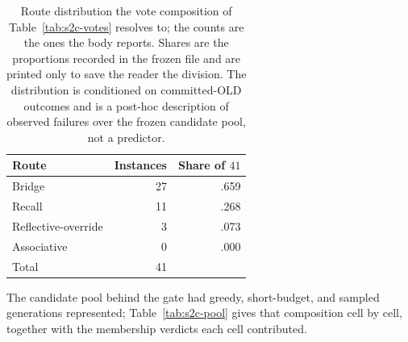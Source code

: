 \documentclass[letterpaper]{article}
\begin{document}
\begin{table}[t]
\centering
\small
\begin{tabular}{lrr}
\toprule
Route & Instances & Share of \(41\) \\
\midrule
Bridge              & 27 & .659 \\
Recall              & 11 & .268 \\
Reflective-override &  3 & .073 \\
Associative         &  0 & .000 \\
\midrule
Total               & 41 & \\
\bottomrule
\end{tabular}
\caption{Route distribution the vote composition of
Table~\ref{tab:s2c-votes} resolves to; the counts are the ones the body reports.
Shares are the proportions recorded in the frozen file and are printed only to
save the reader the division.  The distribution is conditioned on committed-OLD
outcomes and is a post-hoc description of observed failures over the frozen
candidate pool, not a predictor.}
\label{tab:s2c-routes}
\end{table}

The candidate pool behind the gate had greedy, short-budget, and sampled
generations represented; Table~\ref{tab:s2c-pool} gives that composition cell by
cell, together with the membership verdicts each cell contributed.
\end{document}
